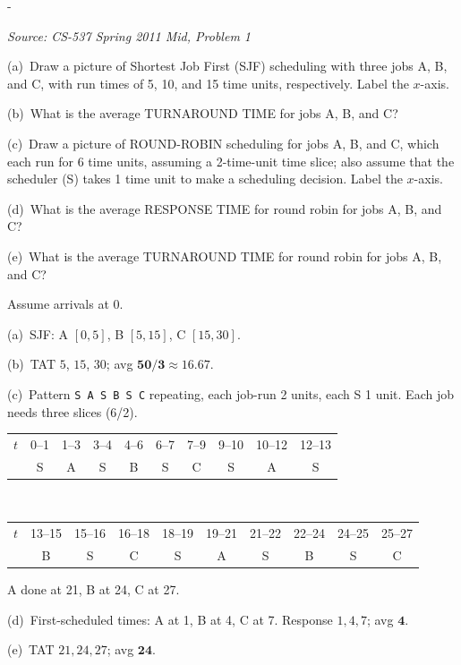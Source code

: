 \documentclass[11pt,a4paper]{article}
\makeatletter
\newcommand{\keepspace}[1]{\par\penalty-100\begingroup
  \setlength{\dimen@}{#1}\dimen@ii\pagegoal\advance\dimen@ii-\pagetotal
  \ifdim\dimen@>\dimen@ii\ifdim\dimen@ii>\z@\vfil\fi\break\fi\endgroup}
\newcounter{qn}[section]
\newenvironment{Qn}[4]{%
  \refstepcounter{qn}\keepspace{7\baselineskip}%
  \begin{tcolorbox}[qboxstyle, title={Q\thesection.\theqn\ \ [#1 \textbar\ #2]\ \ #4}]%
  {\footnotesize\color{g3}\textit{Source: #3}}\par\smallskip%
}{%
  \end{tcolorbox}%
}
\newenvironment{Sol}{%
  \begin{tcolorbox}[sboxstyle, title={Solution}]%
}{%
  \end{tcolorbox}\vspace{0.35em}%
}
\makeatother
\begin{document}
\begin{Qn}{Medium}{Lect 5--6}{CS-537 Spring 2011 Mid, Problem 1}{Draw SJF and RR (with scheduler overhead); TAT and response}
(a)~Draw a picture of Shortest Job First (SJF) scheduling with three jobs A, B, and C, with run times of 5, 10, and 15 time units, respectively. Label the $x$-axis.

(b)~What is the average TURNAROUND TIME for jobs A, B, and C?

(c)~Draw a picture of ROUND-ROBIN scheduling for jobs A, B, and C, which each run for 6 time units, assuming a 2-time-unit time slice; also assume that the scheduler (S) takes 1 time unit to make a scheduling decision. Label the $x$-axis.

(d)~What is the average RESPONSE TIME for round robin for jobs A, B, and C?

(e)~What is the average TURNAROUND TIME for round robin for jobs A, B, and C?
\end{Qn}
\begin{Sol}
Assume arrivals at 0.

(a)~SJF: A $[0,5]$, B $[5,15]$, C $[15,30]$.

(b)~TAT $5$, $15$, $30$; avg $\mathbf{50/3 \approx 16.67}$.

(c)~Pattern \texttt{S A S B S C} repeating, each job-run 2 units, each S 1 unit. Each job needs three slices (6/2).
\begin{center}
\footnotesize
\begin{tabular}{c|ccccccccc}
$t$ & 0--1 & 1--3 & 3--4 & 4--6 & 6--7 & 7--9 & 9--10 & 10--12 & 12--13 \\
 & S & A & S & B & S & C & S & A & S \\
\end{tabular}\\[0.4em]
\begin{tabular}{c|ccccccccc}
$t$ & 13--15 & 15--16 & 16--18 & 18--19 & 19--21 & 21--22 & 22--24 & 24--25 & 25--27 \\
 & B & S & C & S & A & S & B & S & C \\
\end{tabular}
\end{center}
A done at 21, B at 24, C at 27.

(d)~First-scheduled times: A at 1, B at 4, C at 7. Response $1,4,7$; avg $\mathbf{4}$.

(e)~TAT $21,24,27$; avg $\mathbf{24}$.
\end{Sol}
\end{document}
